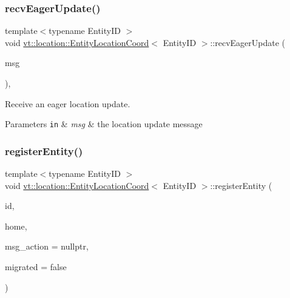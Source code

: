 \subsubsection{\texorpdfstring{recv\+Eager\+Update()}{recvEagerUpdate()}}
{\footnotesize\ttfamily template$<$typename Entity\+ID $>$ \\
void \hyperlink{structvt_1_1location_1_1_entity_location_coord}{vt\+::location\+::\+Entity\+Location\+Coord}$<$ Entity\+ID $>$\+::recv\+Eager\+Update (\begin{DoxyParamCaption}\item[{\hyperlink{structvt_1_1location_1_1_entity_location_coord_a8799cbd5fb0fb04cfdd1012fe1d5908f}{Loc\+Msg\+Type} $\ast$}]{msg }\end{DoxyParamCaption})\hspace{0.3cm}{\ttfamily [static]}, {\ttfamily [private]}}



Receive an eager location update. 


\begin{DoxyParams}[1]{Parameters}
\mbox{\tt in}  & {\em msg} & the location update message \\
\hline
\end{DoxyParams}
\mbox{\label{structvt_1_1location_1_1_entity_location_coord_a3d7f6c252ad5cb8d1084620946245970}} 
\subsubsection{\texorpdfstring{register\+Entity()}{registerEntity()}}
{\footnotesize\ttfamily template$<$typename Entity\+ID $>$ \\
void \hyperlink{structvt_1_1location_1_1_entity_location_coord}{vt\+::location\+::\+Entity\+Location\+Coord}$<$ Entity\+ID $>$\+::register\+Entity (\begin{DoxyParamCaption}\item[{Entity\+ID const \&}]{id,  }\item[{\hyperlink{namespacevt_a866da9d0efc19c0a1ce79e9e492f47e2}{Node\+Type} const \&}]{home,  }\item[{\hyperlink{namespacevt_1_1location_ad0a130e4d79e745543925240e13e8f08}{Loc\+Msg\+Action\+Type}}]{msg\+\_\+action = {\ttfamily nullptr},  }\item[{bool const \&}]{migrated = {\ttfamily false} }\end{DoxyParamCaption})}



